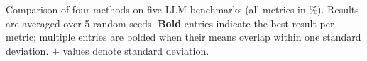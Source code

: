 \caption{Comparison of four methods on five LLM benchmarks (all metrics in \%). Results are averaged over 5 random seeds. \textbf{Bold} entries indicate the best result per metric; multiple entries are bolded when their means overlap within one standard deviation. $\pm$ values denote standard deviation.}
